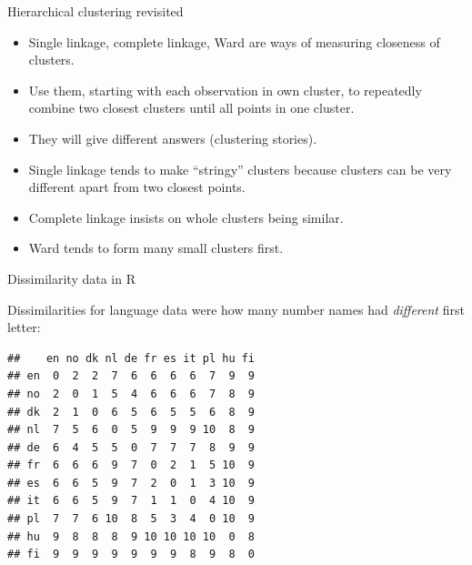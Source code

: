 \begin{frame}[fragile]{Hierarchical clustering revisited}
  
  \begin{itemize}
  \item Single linkage, complete linkage, Ward are ways of measuring
    closeness of clusters.
  \item Use them, starting with each observation in own cluster, to
    repeatedly combine two closest clusters until all points in one
    cluster.
  \item They will give different answers (clustering stories). 
  \item Single linkage tends to make ``stringy'' clusters because
    clusters can be very different apart from two closest points.
  \item Complete linkage insists on whole clusters being similar.
  \item Ward tends to form many small clusters first.
  \end{itemize}
  
\end{frame}

\begin{frame}[fragile]{Dissimilarity data in R}


Dissimilarities for language data\label{p:numberd} were how many
number names had \emph{different} first letter:


\begin{knitrout}
\color{fgcolor}\begin{kframe}
\begin{alltt}
\hlkwb{=}\hlstd{(}\hlstd{,}
\end{alltt}
\begin{verbatim}
##    en no dk nl de fr es it pl hu fi
## en  0  2  2  7  6  6  6  6  7  9  9
## no  2  0  1  5  4  6  6  6  7  8  9
## dk  2  1  0  6  5  6  5  5  6  8  9
## nl  7  5  6  0  5  9  9  9 10  8  9
## de  6  4  5  5  0  7  7  7  8  9  9
## fr  6  6  6  9  7  0  2  1  5 10  9
## es  6  6  5  9  7  2  0  1  3 10  9
## it  6  6  5  9  7  1  1  0  4 10  9
## pl  7  7  6 10  8  5  3  4  0 10  9
## hu  9  8  8  8  9 10 10 10 10  0  8
## fi  9  9  9  9  9  9  9  8  9  8  0
\end{verbatim}
\end{kframe}
\end{knitrout}

\end{frame}

